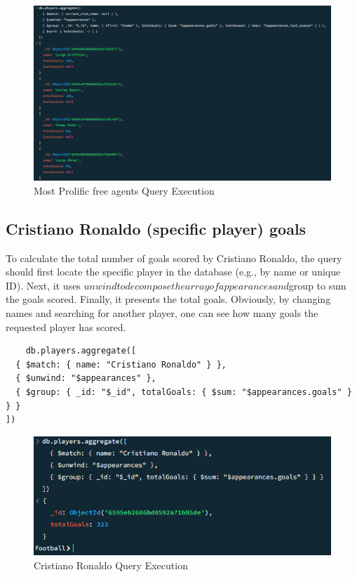 \documentclass{Configuration_Files/PoliMi3i_thesis}
\begin{document}
\begin{figure}[htbp]
    \centering
    \includegraphics[scale=0.8]{Images/Queries/Most_prolific_free_agents/mpfa.png}
    \caption{Most Prolific free agents Query Execution}
\end{figure}


\subsection{Cristiano Ronaldo (specific player) goals }
To calculate the total number of goals scored by Cristiano Ronaldo, the query should first locate the specific player in the database (e.g., by name or unique ID). Next, it uses $unwind to decompose the array of appearances and $group to sum the goals scored. Finally, it presents the total goals.
Obviously, by changing names and searching for another player, one can see how many goals the requested player has scored.
\begin{verbatim}
    db.players.aggregate([
  { $match: { name: "Cristiano Ronaldo" } },
  { $unwind: "$appearances" },
  { $group: { _id: "$_id", totalGoals: { $sum: "$appearances.goals" } } }
])
\end{verbatim}
\begin{figure}[htbp]
    \centering
    \includegraphics[scale=1]{Images/Queries/Cristiano_Ronaldo_goals/CRG.png}
    \caption{Cristiano Ronaldo Query Execution}
\end{figure}
\end{document}
